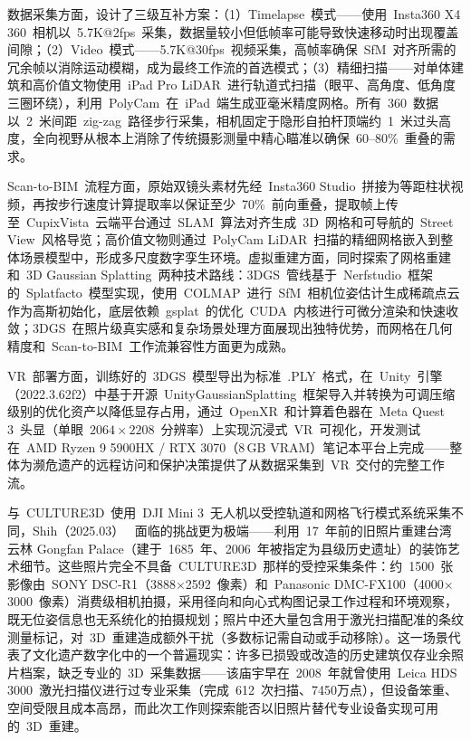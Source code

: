 数据采集方面，设计了三级互补方案：（1）Timelapse~模式——使用~Insta360 X4 360\textdegree~相机以~5.7K@2fps~采集，数据量较小但低帧率可能导致快速移动时出现覆盖间隙；（2）Video~模式——5.7K@30fps~视频采集，高帧率确保~SfM~对齐所需的冗余帧以消除运动模糊，成为最终工作流的首选模式；（3）精细扫描——对单体建筑和高价值文物使用~iPad Pro LiDAR~进行轨道式扫描（眼平、高角度、低角度三圈环绕），利用~PolyCam~在~iPad~端生成亚毫米精度网格。所有~360\textdegree~数据以~2~米间距~zig-zag~路径步行采集，相机固定于隐形自拍杆顶端约~1~米过头高度，全向视野从根本上消除了传统摄影测量中精心瞄准以确保~60--80\%~重叠的需求。

Scan-to-BIM~流程方面，原始双镜头素材先经~Insta360 Studio~拼接为等距柱状视频，再按步行速度计算提取率以保证至少~70\%~前向重叠，提取帧上传至~CupixVista~云端平台通过~SLAM~算法对齐生成~3D~网格和可导航的~Street View~风格导览；高价值文物则通过~PolyCam LiDAR~扫描的精细网格嵌入到整体场景模型中，形成多尺度数字孪生环境。虚拟重建方面，同时探索了网格重建和~3D Gaussian Splatting~两种技术路线：3DGS~管线基于~Nerfstudio~框架的~Splatfacto~模型实现，使用~COLMAP~进行~SfM~相机位姿估计生成稀疏点云作为高斯初始化，底层依赖~gsplat~的优化~CUDA~内核进行可微分渲染和快速收敛；3DGS~在照片级真实感和复杂场景处理方面展现出独特优势，而网格在几何精度和~Scan-to-BIM~工作流兼容性方面更为成熟。

VR~部署方面，训练好的~3DGS~模型导出为标准~.PLY~格式，在~Unity~引擎（2022.3.62f2）中基于开源~UnityGaussianSplatting~框架导入并转换为可调压缩级别的优化资产以降低显存占用，通过~OpenXR~和计算着色器在~Meta Quest 3~头显（单眼~$2064\times2208$~分辨率）上实现沉浸式~VR~可视化，开发测试在~AMD Ryzen 9 5900HX / RTX 3070（8\,GB VRAM）笔记本平台上完成——整体为濒危遗产的远程访问和保护决策提供了从数据采集到~VR~交付的完整工作流。

与~CULTURE3D~使用~DJI Mini 3~无人机以受控轨道和网格飞行模式系统采集不同，Shih（2025.03）~\cite{2503_10031} 面临的挑战更为极端——利用~17~年前的旧照片重建台湾云林 Gongfan Palace（建于~1685~年、2006~年被指定为县级历史遗址）的装饰艺术细节。这些照片完全不具备~CULTURE3D~那样的受控采集条件：约~1500~张影像由~SONY DSC-R1（3888$\times$2592~像素）和~Panasonic DMC-FX100（4000$\times$3000~像素）消费级相机拍摄，采用径向和向心式构图记录工作过程和环境观察，既无位姿信息也无系统化的拍摄规划；照片中还大量包含用于激光扫描配准的条纹测量标记，对~3D~重建造成额外干扰（多数标记需自动或手动移除）。这一场景代表了文化遗产数字化中的一个普遍现实：许多已损毁或改造的历史建筑仅存业余照片档案，缺乏专业的~3D~采集数据——该庙宇早在~2008~年就曾使用~Leica HDS 3000~激光扫描仪进行过专业采集（完成~612~次扫描、7450万点），但设备笨重、空间受限且成本高昂，而此次工作则探索能否以旧照片替代专业设备实现可用的~3D~重建。

